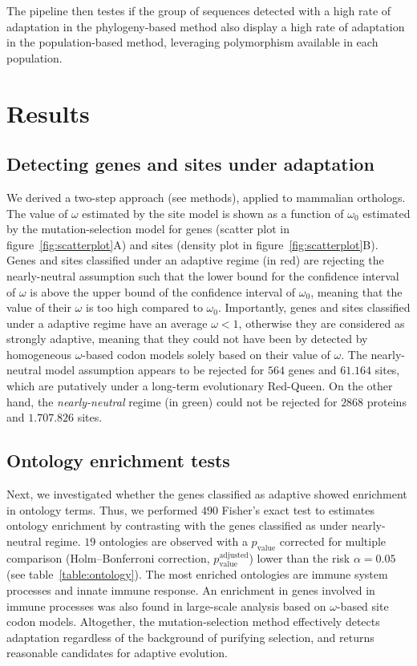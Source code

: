 \documentclass{article}
\begin{document}
The pipeline then testes if the group of sequences detected with a high rate of adaptation in the phylogeny-based method also display a high rate of adaptation in the population-based method, leveraging polymorphism available in each population.

\section*{Results}\label{sec:results}

\subsection*{Detecting genes and sites under adaptation}

We derived a two-step approach (see methods), applied to mammalian orthologs.
The value of $\omega$ estimated by the site model is shown as a function of $\omega_{0}$ estimated by the mutation-selection model for genes (scatter plot in figure~\ref{fig:scatterplot}A) and sites (density plot in figure~\ref{fig:scatterplot}B).
Genes and sites classified under an adaptive regime (in red) are rejecting the nearly-neutral assumption such that the lower bound for the confidence interval of $\omega$ is above the upper bound of the confidence interval of $\omega_{0}$, meaning that the value of their $\omega$ is too high compared to $\omega_{0}$.
Importantly, genes and sites classified under a adaptive regime have an average $\omega < 1$, otherwise they are considered as strongly adaptive, meaning that they could not have been by detected by homogeneous $\omega$-based codon models solely based on their value of $\omega$.
The nearly-neutral model assumption appears to be rejected for $564$ genes and $61.164$ sites, which are putatively under a long-term evolutionary Red-Queen.
On the other hand, the \textit{nearly-neutral} regime (in green) could not be rejected for $2868$ proteins and $1.707.826$ sites.

\subsection*{Ontology enrichment tests}

Next, we investigated whether the genes classified as adaptive showed enrichment in ontology terms.
Thus, we performed $490$ Fisher's exact test to estimates ontology enrichment by contrasting with the genes classified as under nearly-neutral regime.
$19$ ontologies are observed with a $p_{\mathrm{value}}$ corrected for multiple comparison (Holm–Bonferroni correction, $p_{\mathrm{value}}^{\mathrm{adjusted}}$) lower than the risk $\alpha=0.05$ (see table~\ref{table:ontology}).
The most enriched ontologies are immune system processes and innate immune response.
An enrichment in genes involved in immune processes was also found in large-scale analysis based on $\omega$-based site codon models\cite{kosiol_patterns_2008}.
Altogether, the mutation-selection method effectively detects adaptation regardless of the background of purifying selection, and returns reasonable candidates for adaptive evolution.
\end{document}
